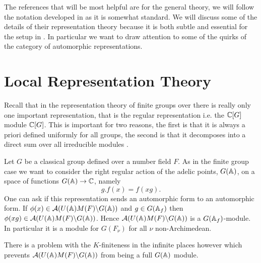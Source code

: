 The references that will be most helpful are \cite[I.II]{borelAutomorphicFormsRepresentations1979}\cite{getzIntroductionAutomorphicRepresentations2024} for the general theory, we will follow the notation developed in \cite{moeglinSpectralDecompositionEisenstein1995} as it is somewhat standard. We will discuss some of the details of their representation theory because it is both subtle and essential for the setup in \cite{jiangPolesCertainResidual2013}. In particular we want to draw attention to some of the quirks of the category of automorphic representations. 

\section{Local Representation Theory}
Recall that in the representation theory of finite groups over \C there is really only one important representation, that is the regular representation i.e. the \(\C[G]\) module \(\C[G]\). This is important for two reasons, the first is that it is always a priori defined uniformly for all groups, the second is that it decomposes into a direct sum over all irreducible modules \cite[Ch. 2.4 Cor. 2 ]{serreLinearRepresentationsFinite1996}.

Let \(G\) be a classical group defined over a number field \(F\). 
As in the finite group case we want to consider the right regular action of the adelic points, \(G(\A)\), on a space of functions \(G(\A) \to \C\), namely
\[g.f(x) = f(xg).\]
One can ask if this representation sends an automorphic form to an automorphic form.
If \(\phi(x)\in \mathcal{A}(U(\A)M(F)\backslash G(\A))\) and \(g\in G(\A_f)\) then \(\phi(xg) \in \mathcal{A}(U(\A)M(F)\backslash G(\A)) \). Hence \(\mathcal{A}(U(\A)M(F)\backslash G(\A))\) is a \(G(\A_f)\)-module. In particular it is a module for \(G(F_\nu)\) for all \(\nu\) non-Archimedean.

There is a problem with the \(K\)-finiteness in the infinite places however which prevents \( \mathcal{A}(U(\A)M(F)\backslash G(\A))\) from being a full \(G(\A)\) module.

